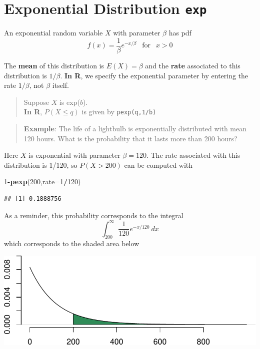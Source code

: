 \documentclass[
]{book}
\newenvironment{Shaded}{\begin{snugshade}}{\end{snugshade}}
\newcommand{\AttributeTok}[1]{\textcolor[rgb]{0.13,0.29,0.53}{#1}}
\newcommand{\DecValTok}[1]{\textcolor[rgb]{0.00,0.00,0.81}{#1}}
\newcommand{\FunctionTok}[1]{\textcolor[rgb]{0.13,0.29,0.53}{\textbf{#1}}}
\newcommand{\NormalTok}[1]{#1}
\newcommand{\SpecialCharTok}[1]{\textcolor[rgb]{0.81,0.36,0.00}{\textbf{#1}}}
\theoremstyle{definition}
\theoremstyle{definition}
\theoremstyle{definition}
\theoremstyle{definition}
\theoremstyle{remark}
\begin{document}
\section{\texorpdfstring{Exponential Distribution \texttt{exp}}{Exponential Distribution exp}}\label{expR}

An exponential random variable \(X\) with parameter \(\beta\) has pdf \[f(x) = \frac{1}{\beta}e^{-x/\beta} ~~\text{ for }~~ x > 0\]

The \textbf{mean} of this distribution is \(E(X) = \beta\) and the \textbf{rate} associated to this distribution is \(1/\beta\). \textbf{In R}, we specify the exponential parameter by entering the rate \(1/\beta\), not \(\beta\) itself.

\begin{quote}
Suppose \(X\) is exp(\(b\)).\\
\textbf{In R}, \(P(X \leq q)\) is given by \texttt{pexp(q,1/b)}
\end{quote}

\begin{quote}
\textbf{Example}: The life of a lightbulb is exponentially distributed with mean 120 hours. What is the probability that it lasts more than 200 hours?
\end{quote}

Here \(X\) is exponential with parameter \(\beta = 120\). The rate associated with this distribution is 1/120, so \(P(X > 200)\) can be computed with

\begin{Shaded}
\begin{Highlighting}[]
\DecValTok{1}\SpecialCharTok{{-}}\FunctionTok{pexp}\NormalTok{(}\DecValTok{200}\NormalTok{,}\AttributeTok{rate=}\DecValTok{1}\SpecialCharTok{/}\DecValTok{120}\NormalTok{)}
\end{Highlighting}
\end{Shaded}

\begin{verbatim}
## [1] 0.1888756
\end{verbatim}

As a reminder, this probability corresponds to the integral
\[\int_{200}^\infty \frac{1}{120}e^{-x/120}~dx\] which corresponds to the shaded area below

\begin{center}\includegraphics{math340-notes_files/figure-latex/unnamed-chunk-182-1} \end{center}
\end{document}
